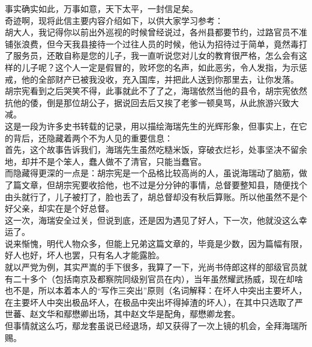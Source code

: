 \begin{multicols}{\theparacolNo}
事实确实如此，万事如意，天下太平，一封信足矣。\\

奇迹啊，现将此信主要内容介绍如下，以供大家学习参考：\\

胡大人，我记得你以前出外巡视的时候曾经说过，各州县都要节约，过路官员不准铺张浪费，但今天我县接待一个过往人员的时候，他认为招待过于简单，竟然毒打了服务员，还敢自称是您的儿子，我一直听说您对儿女的教育很严格，怎么会有这样的儿子呢？这个人一定是假冒的，败坏您的名声，如此恶劣，令人发指，为示惩戒，他的全部财产已被我没收，充入国库，并把此人送到你那里去，让你发落。\\

胡宗宪看到之后哭笑不得，此事就此不了了之，海瑞依然当他的县令，胡宗宪依然抗他的倭，倒是那位胡公子，据说回去后又挨了老爹一顿臭骂，从此旅游兴致大减。\\

这是一段为许多史书转载的记录，用以描绘海瑞先生的光辉形象，但事实上，在它的背后，还隐藏着两个不为人见的重要信息：\\

首先，这个故事告诉我们，海瑞先生虽然吃糙米饭，穿破衣烂衫，处事坚决不留余地，却并不是个笨人，蠢人做不了清官，只能当蠢官。\\

而隐藏得更深的一点是：胡宗宪是一个品格比较高尚的人，虽说海瑞动了脑筋，做了篇文章，但胡宗宪要收拾他，也不过是分分钟的事情，总督要整知县，随便找个由头就行了，儿子被打了，脸也丢了，胡总督却没有秋后算账。所以他虽然不是个好父亲，却实在是个好总督。\\

这一次，海瑞安全过关，但说到底，还是因为遇见了好人，下一次，他就没这么幸运了。\\

说来惭愧，明代人物众多，但能上兄弟这篇文章的，毕竟是少数，因为篇幅有限，好人也好，坏人也罢，只有名人才能露脸。\\

就以严党为例，其实严嵩的手下很多，我算了一下，光尚书侍郎这样的部级官员就有二十多个（包括南京及都察院同级别官员在内），当年虽然耀武扬威，现在却啥也不是，所以本着本人的“写作三突出”原则（名词解释：在坏人中突出主要坏人，在主要坏人中突出极品坏人，在极品中突出坏得掉渣的坏人），在其中只选取了严世蕃、赵文华和鄢懋卿出场，其中赵文华是配角，鄢懋卿龙套。\\

但事情就这么巧，鄢龙套虽说已经退场，却又获得了一次上镜的机会，全拜海瑞所赐。\\


\end{multicols}
